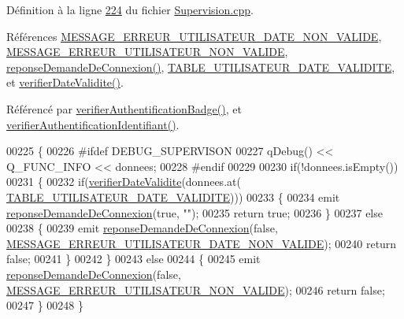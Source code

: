 Définition à la ligne \hyperlink{_supervision_8cpp_source_l00224}{224} du fichier \hyperlink{_supervision_8cpp_source}{Supervision.\+cpp}.



Références \hyperlink{_ihm_8h_source_l00033}{M\+E\+S\+S\+A\+G\+E\+\_\+\+E\+R\+R\+E\+U\+R\+\_\+\+U\+T\+I\+L\+I\+S\+A\+T\+E\+U\+R\+\_\+\+D\+A\+T\+E\+\_\+\+N\+O\+N\+\_\+\+V\+A\+L\+I\+DE}, \hyperlink{_ihm_8h_source_l00032}{M\+E\+S\+S\+A\+G\+E\+\_\+\+E\+R\+R\+E\+U\+R\+\_\+\+U\+T\+I\+L\+I\+S\+A\+T\+E\+U\+R\+\_\+\+N\+O\+N\+\_\+\+V\+A\+L\+I\+DE}, \hyperlink{class_supervision_a116ed6de0e9e3c9c94886235e9f6d6e8}{reponse\+Demande\+De\+Connexion()}, \hyperlink{_utilisateur_8h_source_l00032}{T\+A\+B\+L\+E\+\_\+\+U\+T\+I\+L\+I\+S\+A\+T\+E\+U\+R\+\_\+\+D\+A\+T\+E\+\_\+\+V\+A\+L\+I\+D\+I\+TE}, et \hyperlink{_supervision_8cpp_source_l00198}{verifier\+Date\+Validite()}.



Référencé par \hyperlink{_supervision_8cpp_source_l00124}{verifier\+Authentification\+Badge()}, et \hyperlink{_supervision_8cpp_source_l00141}{verifier\+Authentification\+Identifiant()}.


\begin{DoxyCode}
00225 \{
00226 \textcolor{preprocessor}{    #ifdef DEBUG\_SUPERVISON}
00227         qDebug() << Q\_FUNC\_INFO << donnees;
00228 \textcolor{preprocessor}{    #endif}
00229 
00230     \textcolor{keywordflow}{if}(!donnees.isEmpty())
00231     \{
00232         \textcolor{keywordflow}{if}(\hyperlink{class_supervision_acc886b933823993f1e3873582e05e690}{verifierDateValidite}(donnees.at(
      \hyperlink{_utilisateur_8h_a2ee8bc4f44f3f2562a41638ec1d84ffca1a0604e4b99c353c04b8ee64a2524cca}{TABLE\_UTILISATEUR\_DATE\_VALIDITE})))
00233         \{
00234             emit \hyperlink{class_supervision_a116ed6de0e9e3c9c94886235e9f6d6e8}{reponseDemandeDeConnexion}(\textcolor{keyword}{true}, \textcolor{stringliteral}{""});
00235             \textcolor{keywordflow}{return} \textcolor{keyword}{true};
00236         \}
00237         \textcolor{keywordflow}{else}
00238         \{
00239             emit \hyperlink{class_supervision_a116ed6de0e9e3c9c94886235e9f6d6e8}{reponseDemandeDeConnexion}(\textcolor{keyword}{false}, 
      \hyperlink{_ihm_8h_a65a121daaef1677092ae2f6fa3392a10}{MESSAGE\_ERREUR\_UTILISATEUR\_DATE\_NON\_VALIDE});
00240             \textcolor{keywordflow}{return} \textcolor{keyword}{false};
00241         \}
00242     \}
00243     \textcolor{keywordflow}{else}
00244     \{
00245         emit \hyperlink{class_supervision_a116ed6de0e9e3c9c94886235e9f6d6e8}{reponseDemandeDeConnexion}(\textcolor{keyword}{false}, 
      \hyperlink{_ihm_8h_ac7f9ed2a1a76baab688e98e093b5d8fd}{MESSAGE\_ERREUR\_UTILISATEUR\_NON\_VALIDE});
00246         \textcolor{keywordflow}{return} \textcolor{keyword}{false};
00247     \}
00248 \}
\end{DoxyCode}


